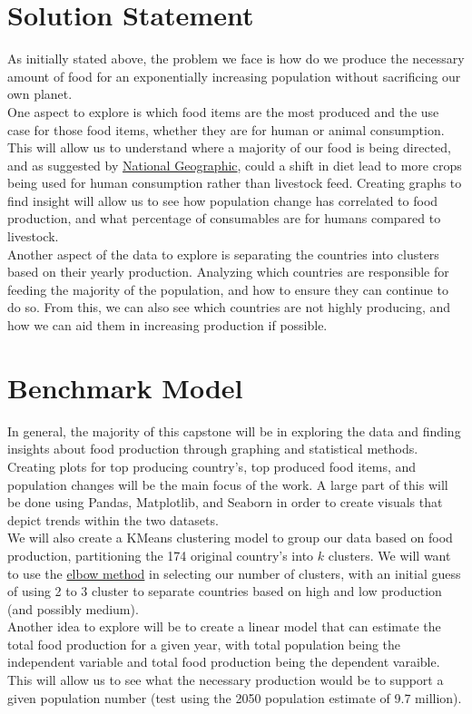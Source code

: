 \documentclass[12pt, a4paper]{article}
\begin{document}
\begin{spacing}{1.1}
	\section{Solution Statement}
	As initially stated above, the problem we face is how do we produce the necessary amount of food for an exponentially increasing population without sacrificing our own planet. \vspace*{2mm}\\	
	One aspect to explore is which food items are the most produced and the use case for those food items, whether they are for human or animal consumption. This will allow us to understand where a majority of our food is being directed, and as suggested by \href{https://www.nationalgeographic.com/foodfeatures/feeding-9-billion/}{National Geographic}, could a shift in diet lead to more crops being used for human consumption rather than livestock feed. Creating graphs to find insight will allow us to see how population change has correlated to food production, and what percentage of consumables are for humans compared to livestock. \vspace*{2mm}\\	
	Another aspect of the data to explore is separating the countries into clusters based on their yearly production. Analyzing which countries are responsible for feeding the majority of the population, and how to ensure they can continue to do so. From this, we can also see which countries are not highly producing, and how we can aid them in increasing production if possible.\newpage

	
	\section{Benchmark Model}
	In general, the majority of this capstone will be in exploring the data and finding insights about food production through graphing and statistical methods. Creating plots for top producing country's, top produced food items, and population changes will be the main focus of the work. A large part of this will be done using Pandas, Matplotlib, and Seaborn in order to create visuals that depict trends within the two datasets. \vspace*{2mm}\\	
	We will also create a KMeans clustering model to group our data based on food production, partitioning the 174 original country's into $k$ clusters. We will want to use the \href{https://www.scikit-yb.org/en/latest/api/cluster/elbow.html}{elbow method} in selecting our number of clusters, with an initial guess of using 2 to 3 cluster to separate countries based on high and low production (and possibly medium). \vspace*{2mm}\\
	Another idea to explore will be to create a linear model that can estimate the total food production for a given year, with total population being the independent variable and total food production being the dependent varaible. This will allow us to see what the necessary production would be to support a given population number (test using the 2050 population estimate of 9.7 million).
	

\end{spacing}
\end{document}
